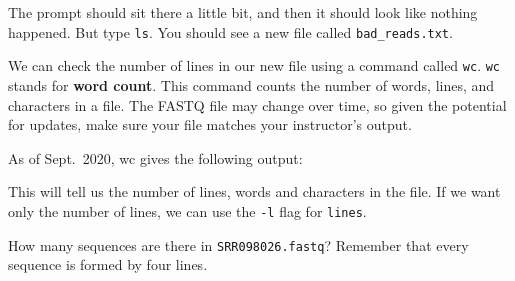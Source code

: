 \documentclass[
  letterpaper,
  DIV=11,
  numbers=noendperiod]{scrreprt}
\newenvironment{Shaded}{\begin{snugshade}}{\end{snugshade}}
\newcommand{\AttributeTok}[1]{\textcolor[rgb]{0.40,0.45,0.13}{#1}}
\newcommand{\ExtensionTok}[1]{\textcolor[rgb]{0.00,0.23,0.31}{#1}}
\newcommand{\NormalTok}[1]{\textcolor[rgb]{0.00,0.23,0.31}{#1}}
\begin{document}
The prompt should sit there a little bit, and then it should look like
nothing happened. But type \texttt{ls}. You should see a new file called
\texttt{bad\_reads.txt}.

We can check the number of lines in our new file using a command called
\texttt{wc}. \texttt{wc} stands for \textbf{word count}. This command
counts the number of words, lines, and characters in a file. The FASTQ
file may change over time, so given the potential for updates, make sure
your file matches your instructor's output.

As of Sept.~2020, wc gives the following output:

\begin{Shaded}
\end{Shaded}

This will tell us the number of lines, words and characters in the file.
If we want only the number of lines, we can use the \texttt{-l} flag for
\texttt{lines}.

\begin{Shaded}
\end{Shaded}

\begin{tcolorbox}[enhanced jigsaw, opacitybacktitle=0.6, colback=white, coltitle=black, opacityback=0, rightrule=.15mm, toptitle=1mm, toprule=.15mm, bottomtitle=1mm, colframe=quarto-callout-caution-color-frame, arc=.35mm, titlerule=0mm, colbacktitle=quarto-callout-caution-color!10!white, leftrule=.75mm, title={Exercise}, breakable, bottomrule=.15mm, left=2mm]

How many sequences are there in \texttt{SRR098026.fastq}? Remember that
every sequence is formed by four lines.

\end{tcolorbox}
\end{document}
